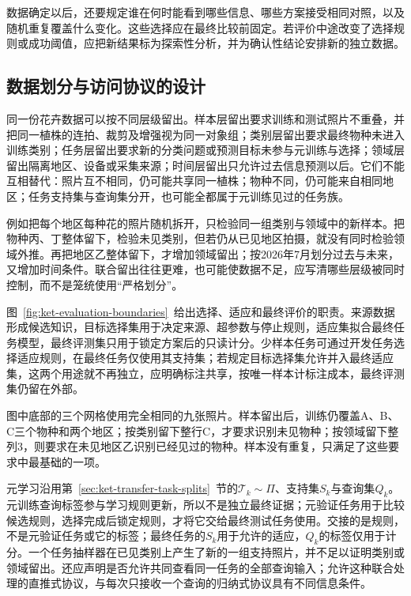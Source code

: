 数据确定以后，还要规定谁在何时能看到哪些信息、哪些方案接受相同对照，以及随机重复覆盖什么变化。这些选择应在最终比较前固定。若评价中途改变了选择规则或成功阈值，应把新结果标为探索性分析，并为确认性结论安排新的独立数据。

\subsection{数据划分与访问协议的设计}
\label{sec:ket-evaluation-splits}

同一份花卉数据可以按不同层级留出。样本层留出要求训练和测试照片不重叠，并把同一植株的连拍、裁剪及增强视为同一对象组；类别层留出要求最终物种未进入训练类别；任务层留出要求新的分类问题或预测目标未参与元训练与选择；领域层留出隔离地区、设备或采集来源；时间层留出只允许过去信息预测以后。它们不能互相替代：照片互不相同，仍可能共享同一植株；物种不同，仍可能来自相同地区；任务支持集与查询集分开，也可能全都属于元训练见过的任务族。

例如把每个地区每种花的照片随机拆开，只检验同一组类别与领域中的新样本。把物种丙、丁整体留下，检验未见类别，但若仍从已见地区拍摄，就没有同时检验领域外推。再把地区乙整体留下，才增加领域留出；按2026年7月划分过去与未来，又增加时间条件。联合留出往往更难，也可能使数据不足，应写清哪些层级被同时控制，而不是笼统使用“严格划分”。

图~\ref{fig:ket-evaluation-boundaries}~给出选择、适应和最终评价的职责。来源数据形成候选知识，目标选择集用于决定来源、超参数与停止规则，适应集拟合最终任务模型，最终评测集只用于锁定方案后的只读计分。少样本任务可通过开发任务选择适应规则，在最终任务仅使用其支持集；若规定目标选择集允许并入最终适应集，这两个用途就不再独立，应明确标注共享，按唯一样本计标注成本，最终评测集仍留在外部。

图中底部的三个网格使用完全相同的九张照片。样本留出后，训练仍覆盖A、B、C三个物种和两个地区；按类别留下整行C，才要求识别未见物种；按领域留下整列3，则要求在未见地区乙识别已经见过的物种。样本没有重复，只满足了这些要求中最基础的一项。

元学习沿用第~\ref{sec:ket-transfer-task-splits}~节的$\mathcal T_k\sim\Pi$、支持集$S_k$与查询集$Q_k$。元训练查询标签参与学习规则更新，所以不是独立最终证据；元验证任务用于比较候选规则，选择完成后锁定规则，才将它交给最终测试任务使用。交接的是规则，不是元验证任务或它的标签；最终任务的$S_k$用于允许的适应，$Q_k$的标签仅用于计分。一个任务抽样器在已见类别上产生了新的一组支持照片，并不足以证明类别或领域留出。还应声明是否允许共同查看同一任务的全部查询输入；允许这种联合处理的直推式协议，与每次只接收一个查询的归纳式协议具有不同信息条件。

